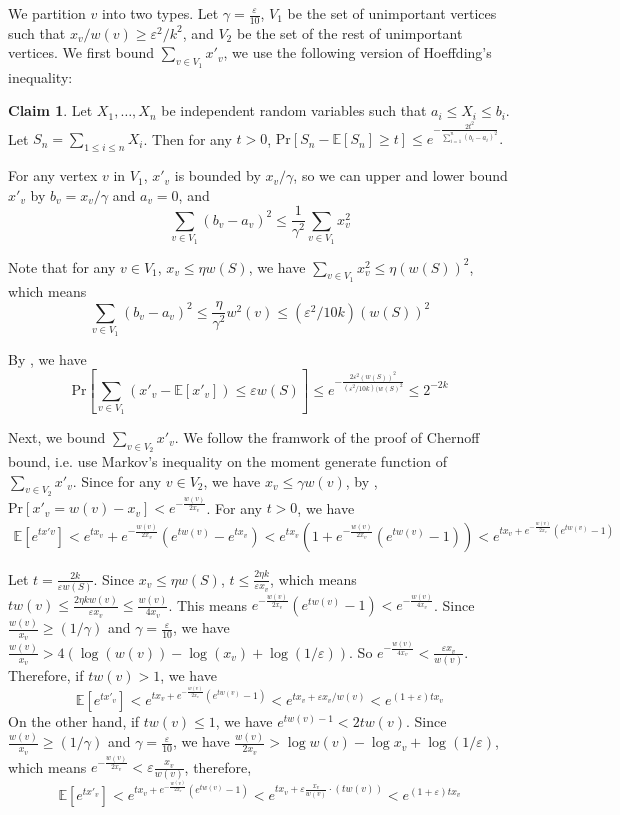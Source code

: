 \documentclass[11pt]{article}
\theoremstyle{definition}
\newtheorem{claim}[theorem]{Claim}
\newcommand{\eps}{{\varepsilon}}
\def\pr#1{\mathrm{Pr}\left[ #1 \right]}
\def\ex#1{{\mathbb{E}}\left[ #1 \right]}
\begin{document}
We partition $v$ into two types. Let $\gamma = \frac{\eps}{10}$, $V_1$ be the set of unimportant vertices such that $x_v/w(v) \ge \eps^2/k^2$, and $V_2$ be the set of the rest of unimportant vertices. We first bound $\sum_{v \in V_1} x'_v$, we use the following version of Hoeffding's inequality:

\begin{claim} \label{hoeffding}
    Let $X_1,\dots,X_n$ be independent random variables such that $a_i \le X_i \le b_i$. Let $S_n = \sum_{1\le  i\le n}X_i$. Then for any $t>0$,
    $\pr{S_n - \ex{S_n} \ge t} \le e^{-\frac{2t^2}{\sum_{i=1}^n(b_i-a_i)^2}}.
    $
\end{claim}

For any vertex $v$ in $V_1$, $x'_v$ is bounded by $x_v/\gamma$, so we can upper and lower bound $x'_v$ by $b_v = x_v/\gamma$ and $a_v=0$, and 
$$
    \sum_{v\in V_1} (b_v-a_v)^2 \le \frac{1}{\gamma^2} \sum_{v\in V_1} x^2_v
$$

Note that for any $v \in V_1$, $x_v \le \eta w(S)$, we have $\sum_{v\in V_1} x^2_v \le \eta (w(S))^2$, which means 
$$
    \sum_{v\in V_1} (b_v-a_v)^2 \le \frac{\eta}{\gamma^2} w^2(v) \le (\eps^2/10k) (w(S))^2
$$

By , we have 
$$
    \pr{\sum_{v \in V_1} (x'_v - \ex{x'_v}) \le \eps w(S)} \le e^{-\frac{2\eps^2 (w(S))^2}{(\eps^2/10k)(w(S)^2}} \le 2^{-2k}
$$

Next, we bound $\sum_{v \in V_2} x'_v$. We follow the framwork of the proof of Chernoff bound, i.e. use Markov's inequality on the moment generate function of $
\sum_{v \in V_2} x'_v$. Since for any $v \in V_2$, we have $x_v \le \gamma w(v)$, by , $\pr{x'_v = w(v)-x_v} < e^{-\frac{w(v)}{2x_v}}$. For any $t>0$, we have 
\begin{align*}
    \ex{e^{tx'v}} < e^{tx_v} + e^{-\frac{w(v)}{2x_v}}(e^{tw(v)}-e^{tx_v}) < e^{tx_v}(1+e^{-\frac{w(v)}{2x_v}}(e^{tw(v)}-1)) < e^{tx_v + e^{-\frac{w(v)}{2x_v}}(e^{tw(v)}-1)}
\end{align*}

Let $t = \frac{2k}{\eps w(S)}$. Since $x_v \le \eta w(S)$, $t \le \frac{2 \eta k}{\eps x_v}$, which means $tw(v) \le \frac{2\eta k w(v)}{\eps x_v} \le \frac{w(v)}{4x_v}$. This means $e^{-\frac{w(v)}{2x_v}}(e^{tw(v)}-1)< e^{-\frac{w(v)}{4x_v}}$. Since $\frac{w(v)}{x_v} \ge (1/\gamma)$ and $\gamma=\frac{\eps}{10}$, we have $\frac{w(v)}{x_v}>4( \log (w(v))-\log(x_v) + \log (1/\eps))$. So $e^{-\frac{w(v)}{4x_v}}<\frac{\eps x_v}{w(v)}$. Therefore, if $tw(v) > 1$, we have 
$$
    \ex{e^{tx'_v}}<e^{tx_v + e^{-\frac{w(v)}{2x_v}}(e^{tw(v)}-1)}<e^{tx_v + \eps x_v/w(v)}<e^{(1+\eps)tx_v}
$$
On the other hand, if $tw(v) \le 1$, we have $e^{tw(v)-1} < 2tw(v)$. Since $\frac{w(v)}{x_v} \ge (1/\gamma)$ and $\gamma=\frac{\eps}{10}$, we have $\frac{w(v)}{2x_v} > \log w(v) - \log x_v + \log (1/\eps)$, which means $e^{-\frac{w(v)}{2x_v}}<\eps\frac{x_v}{w(v)}$, therefore,
$$
    \ex{e^{tx'_v}}<e^{tx_v + e^{-\frac{w(v)}{2x_v}}(e^{tw(v)}-1)}<e^{tx_v + \eps\frac{x_v}{w(v)} \cdot (tw(v))} < e^{(1+\eps)tx_v}
$$
\end{document}
